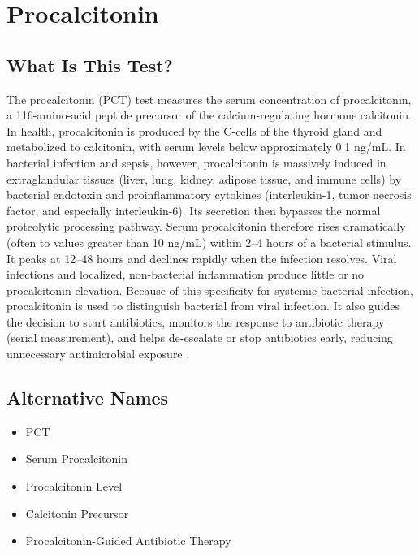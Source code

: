 \chapter{Procalcitonin}

\section*{What Is This Test?}
The procalcitonin (PCT) test measures the serum concentration of procalcitonin, a 116-amino-acid peptide precursor of the calcium-regulating hormone calcitonin. In health, procalcitonin is produced by the C-cells of the thyroid gland and metabolized to calcitonin, with serum levels below approximately 0.1 ng/mL. In bacterial infection and sepsis, however, procalcitonin is massively induced in extraglandular tissues (liver, lung, kidney, adipose tissue, and immune cells) by bacterial endotoxin and proinflammatory cytokines (interleukin-1, tumor necrosis factor, and especially interleukin-6). Its secretion then bypasses the normal proteolytic processing pathway. Serum procalcitonin therefore rises dramatically (often to values greater than 10 ng/mL) within 2--4 hours of a bacterial stimulus. It peaks at 12--48 hours and declines rapidly when the infection resolves. Viral infections and localized, non-bacterial inflammation produce little or no procalcitonin elevation. Because of this specificity for systemic bacterial infection, procalcitonin is used to distinguish bacterial from viral infection. It also guides the decision to start antibiotics, monitors the response to antibiotic therapy (serial measurement), and helps de-escalate or stop antibiotics early, reducing unnecessary antimicrobial exposure \cite{schuetz2017procalcitonin}.

\section*{Alternative Names}
\begin{itemize}
  \item PCT
  \item Serum Procalcitonin
  \item Procalcitonin Level
  \item Calcitonin Precursor
  \item Procalcitonin-Guided Antibiotic Therapy
\end{itemize}
